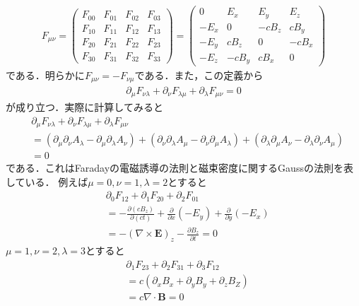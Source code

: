 \documentclass{report}
\begin{document}
  \begin{align}
    F_{\mu\nu}=
    \begin{pmatrix}
      F_{00} & F_{01} & F_{02} & F_{03}\\
      F_{10} & F_{11} & F_{12} & F_{13}\\
      F_{20} & F_{21} & F_{22} & F_{23}\\
      F_{30} & F_{31} & F_{32} & F_{33}
    \end{pmatrix}
    =
    \begin{pmatrix}
      0 & E_x & E_y & E_z \\
      -E_x & 0 & -cB_z & cB_y\\
      -E_y & cB_z & 0 & -cB_x\\
      -E_z& -cB_y & cB_x & 0
    \end{pmatrix}
  \end{align}
  である．明らかに$F_{\mu\nu} = -F_{\nu\mu}$である．また，この定義から
  \begin{align}
    \partial_\mu F_{\nu\lambda} + \partial_\nu F_{\lambda\mu} + \partial_\lambda F_{\mu\nu} = 0
  \end{align}
  が成り立つ．実際に計算してみると
  \begin{align}
    &\partial_\mu F_{\nu\lambda} + \partial_\nu F_{\lambda\mu} + \partial_\lambda F_{\mu\nu} \\
    &= (\partial_\mu\partial_\nu A_\lambda - \partial_\mu\partial_\lambda A_\nu) + (\partial_\nu\partial_\lambda A_\mu - \partial_\nu\partial_\mu A_\lambda)
    + (\partial_\lambda\partial_\mu A_\nu - \partial_\lambda\partial_\nu A_\mu)\\
    &= 0
  \end{align}
  である．これはFaradayの電磁誘導の法則と磁束密度に関するGaussの法則を表している．
  例えば$\mu = 0,\nu = 1, \lambda =2$とすると
  \begin{align}
    &\partial_0 F_{12} + \partial_1 F_{20} + \partial_2 F_{01}\\
    &= -\frac{\partial (cB_z)}{\partial (ct)} + \frac{\partial}{\partial x}(-E_y) + \frac{\partial}{\partial y}(-E_x)\\
    &= -(\nabla\times \bm{E})_z - \frac{\partial B_z}{\partial t} = 0
  \end{align}
  $\mu=1,\nu=2,\lambda=3$とすると
  \begin{align}
    &\partial_1 F_{23} + \partial_2 F_{31} + \partial_3 F_{12}\\
    &= c(\partial_xB_x + \partial_yB_y + \partial_zB_Z)\\
    &= c\nabla\cdot\bm{B} = 0
  \end{align}
\end{document}
